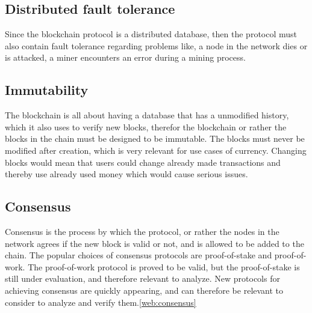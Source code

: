 
\subsection{Distributed fault tolerance}
Since the blockchain protocol is a distributed database, then the protocol must also contain fault tolerance regarding problems like, a node in the network dies or is attacked, a miner encounters an error during a mining process.

\subsection{Immutability}
The blockchain is all about having a database that has a unmodified history, which it also uses to verify new blocks, therefor the blockchain or rather the blocks in the chain must be designed to be immutable. The blocks must never be modified after creation, which is very relevant for use cases of currency. Changing blocks would mean that users could change already made transactions and thereby use already used money which would cause serious issues.

\subsection{Consensus}
Consensus is the process by which the protocol, or rather the nodes in the network agrees if the new block is valid or not, and is allowed to be added to the chain. The popular choices of consensus protocols are proof-of-stake and proof-of-work. The proof-of-work protocol is proved to be valid, but the proof-of-stake is still under evaluation, and therefore relevant to analyze. New protocols for achieving consensus are quickly appearing, and can therefore be relevant to consider to analyze and verify them.\ref{web:consensus}

